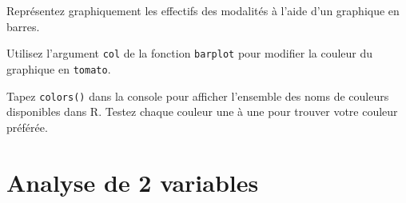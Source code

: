 \documentclass[12pt,]{book}
\newenvironment{Shaded}{\begin{snugshade}}{\end{snugshade}}
\newcommand{\DataTypeTok}[1]{\textcolor[rgb]{0.27,0.27,0.27}{#1}}
\newcommand{\KeywordTok}[1]{\textcolor[rgb]{0.27,0.27,0.27}{\textbf{#1}}}
\newcommand{\NormalTok}[1]{#1}
\newcommand{\OperatorTok}[1]{\textcolor[rgb]{0.43,0.43,0.43}{\textbf{#1}}}
\newcommand{\StringTok}[1]{\textcolor[rgb]{0.5,0.5,0.5}{#1}}
\begin{document}
Représentez graphiquement les effectifs des modalités à l'aide d'un graphique en barres.

Utilisez l'argument \texttt{col} de la fonction \texttt{barplot} pour modifier la couleur du graphique en
\texttt{tomato}.

\iffalse

\begin{solution}

\begin{Shaded}
\begin{Highlighting}[]
\KeywordTok{barplot}\NormalTok{(tab, }\DataTypeTok{col =} \StringTok{"tomato"}\NormalTok{)}
\end{Highlighting}
\end{Shaded}

\end{solution}

\fi

Tapez \texttt{colors()} dans la console pour afficher l'ensemble des noms de couleurs disponibles dans R. Testez chaque couleur une à une pour trouver votre couleur préférée.

\iffalse

\begin{solution}

C'est une blague, hein~! Cela dit \texttt{moccasin} ou \texttt{palevioletred} sont pas mal, si vous voulez essayer :-)

\end{solution}

\fi

\hypertarget{analyse-de-2-variables}{%
\section{Analyse de 2 variables}\label{analyse-de-2-variables}}
\end{document}
